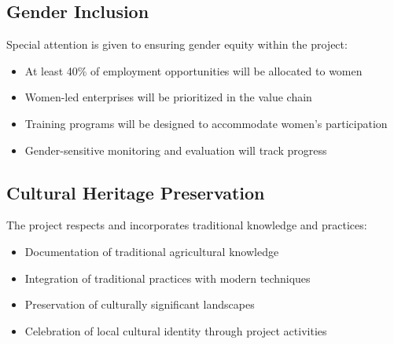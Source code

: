 \subsection{Gender Inclusion}

Special attention is given to ensuring gender equity within the project:

\begin{itemize}
    \item At least 40\% of employment opportunities will be allocated to women
    \item Women-led enterprises will be prioritized in the value chain
    \item Training programs will be designed to accommodate women's participation
    \item Gender-sensitive monitoring and evaluation will track progress
\end{itemize}

\subsection{Cultural Heritage Preservation}

The project respects and incorporates traditional knowledge and practices:

\begin{itemize}
    \item Documentation of traditional agricultural knowledge
    \item Integration of traditional practices with modern techniques
    \item Preservation of culturally significant landscapes
    \item Celebration of local cultural identity through project activities
\end{itemize} 